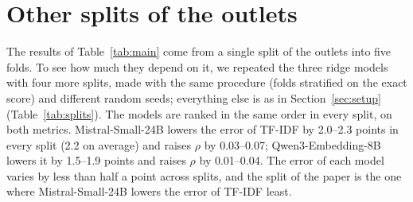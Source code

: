 \documentclass[11pt,a4paper]{article}
\begin{document}
\begin{table}[h]
\centering
\caption{More metrics per outlet (226 outlets, all articles), with 95\% bootstrap intervals.}\label{tab:more}
\end{table}

\section{Other splits of the outlets}\label{app:splits}
The results of Table~\ref{tab:main} come from a single split of the outlets into five folds. To see how much they
depend on it, we repeated the three ridge models with four more splits, made with the same procedure (folds stratified
on the exact score) and different random seeds; everything else is as in Section~\ref{sec:setup}
(Table~\ref{tab:splits}). The models are ranked in the same order in every split, on both metrics. Mistral-Small-24B
lowers the error of TF-IDF by 2.0--2.3 points in every split (2.2 on average) and raises $\rho$ by 0.03--0.07;
Qwen3-Embedding-8B lowers it by 1.5--1.9 points and raises $\rho$ by 0.01--0.04. The error of each model varies by
less than half a point across splits, and the split of the paper is the one where Mistral-Small-24B lowers the error of
TF-IDF least.
\end{document}
